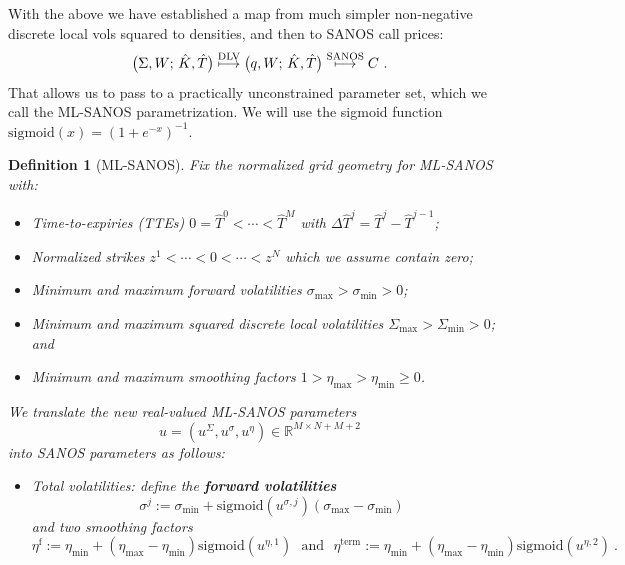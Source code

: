 \documentclass[11pt,a4paper]{article}
\newtheorem{definition}{Definition}[section]
\newcommand{\R}{\mathbb{R}}
\DeclareRobustCommand{\supstack}[2]{\stackrel{\mbox{{\scriptsize ${#1}$}}}{ {#2} }}     %
\DeclareRobustCommand{\eqlabel}[1]{\label{eq:#1}}                                     %
\DeclareRobustCommand{\eq}[1]{\begin{equation}\eqlabel{#1}}                           %
\DeclareRobustCommand{\eqx}{\begin{equation}}                                         %
\DeclareRobustCommand{\eqend}{\end{equation}}                                         %
\begin{document}
With the above we have established a map from much simpler non-negative discrete local vols squared to
densities, and then to SANOS call prices:
\begin{equation}\label{eq:sanosmap2}
    \big( \Sigma, W;\, \hat K,\hat T\big) \supstack{\mathrm{DLV}}\longmapsto
    \big( q, W;\, \hat K,\hat T\big) \supstack{\mathrm{SANOS}}\longmapsto C \ .
\end{equation}
That allows us to pass to a practically unconstrained parameter set, which we call the ML-SANOS parametrization.
We will use the sigmoid function $\mathrm{sigmoid}(x)=(1+e^{-x})^{-1}$.

\begin{definition}[ML-SANOS]\label{def:ml-sanos}
    Fix the normalized grid geometry for ML-SANOS with:
    \begin{itemize}
        \item Time-to-expiries (TTEs) $0=\hat T^0<\cdots<\hat T^M$ with
        $\Delta\hat T^j = \hat T^j-\hat T^{j-1}$;
        \item Normalized strikes $z^1<\cdots<0<\cdots<z^N$ which we assume contain zero;
        \item Minimum and maximum forward volatilities $\sigma_{\max} > \sigma_{\min} > 0$; 
        \item Minimum and maximum squared discrete local volatilities $\Sigma_{\max} > \Sigma_{\min} > 0$; and
        \item Minimum and maximum smoothing factors $1> \eta_{\max} > \eta_{\min} \geq 0$.
    \end{itemize}
    We translate the new real-valued \emph{ML-SANOS parameters}
    \eq{production-native-state}
      u=(u^\Sigma,u^\sigma,u^{\eta})    \in\R^{M\times N+M+2}
    \eqend
    into SANOS parameters as follows:
    \begin{itemize}
        \item Total volatilities: 
        define the \textbf{forward volatilities}
             \eqx
                    \sigma^j := \sigma_{\min}
               +\mathrm{sigmoid}( u^{\sigma,j} ) ( \sigma_{\max} - \sigma_{\min} )
            \eqend
            and two smoothing factors
            \begin{equation}
                \label{eq:etatrans}
                \eta^{\mathrm f}:=\eta_{\min}
                  +(\eta_{\max}-\eta_{\min})
                    \mathrm{sigmoid}(u^{\eta,1}) \ \ \ \mbox{and} \ \ \
                \eta^{\mathrm{term}}:=\eta_{\min}
                  +(\eta_{\max}-\eta_{\min})
                    \mathrm{sigmoid}(u^{\eta,2}) \ .

\end{equation}
\end{itemize}
\end{definition}
\end{document}
